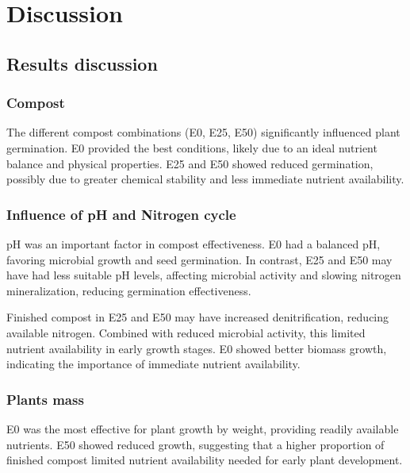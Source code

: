 \documentclass{article}
\begin{document}
\newpage
\section{Discussion}
\subsection{Results discussion}
\subsubsection{Compost}
The different compost combinations (E0, E25, E50) significantly influenced plant
germination. E0 provided the best conditions, likely due to an ideal nutrient balance and
physical properties. E25 and E50 showed reduced germination, possibly due to greater
chemical stability and less immediate nutrient availability.

\subsubsection{Influence of pH and Nitrogen cycle}
pH was an important factor in compost effectiveness. E0 had a balanced pH, favoring
microbial growth and seed germination. In contrast, E25 and E50 may have had less suitable
pH levels, affecting microbial activity and slowing nitrogen mineralization, reducing
germination effectiveness.

Finished compost in E25 and E50 may have increased denitrification, reducing available
nitrogen. Combined with reduced microbial activity, this limited nutrient availability in
early growth stages. E0 showed better biomass growth, indicating the importance of
immediate nutrient availability.

\subsubsection{Plants mass}
E0 was the most effective for plant growth by weight, providing readily available
nutrients. E50 showed reduced growth, suggesting that a higher proportion of finished
compost limited nutrient availability needed for early plant development.
\end{document}
